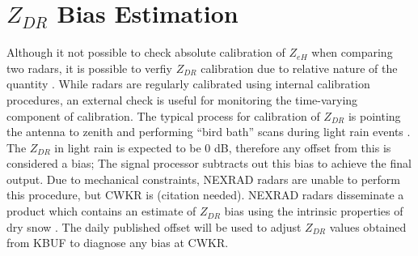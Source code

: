 \section{$Z_{DR}$ Bias Estimation}
Although it not possible to check absolute calibration of $Z_{eH}$ when comparing two radars, it is possible to verfiy $Z_{DR}$ calibration due to relative nature of the quantity \citep{Zrnic2006}.
While radars are regularly calibrated using internal calibration procedures, an external check is useful for monitoring the time-varying component of calibration. The typical process for calibration of $Z_{DR}$ is pointing the antenna to zenith and performing ``bird bath'' scans during light rain events \citep{Hubbert2006}. The $Z_{DR}$ in light rain is expected to be 0 dB, therefore any offset from this is considered a bias; The signal processor subtracts out this bias to achieve the final output. Due to mechanical constraints, NEXRAD radars are unable to perform this procedure, but CWKR is (citation needed). NEXRAD radars disseminate a product which contains an estimate of $Z_{DR}$ bias using the intrinsic properties of dry snow \cite{Zittel2015}. The daily published offset will be used to adjust $Z_{DR}$ values obtained from KBUF to diagnose any bias at CWKR.




